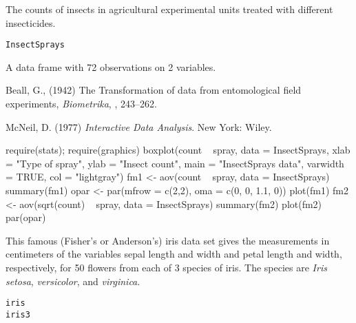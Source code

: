 %
\begin{Description}\relax
The counts of insects in agricultural experimental units treated with
different insecticides.
\end{Description}
%
\begin{Usage}
\begin{verbatim}
InsectSprays
\end{verbatim}
\end{Usage}
%
\begin{Format}
A data frame with 72 observations on 2 variables.

\end{Format}
%
\begin{Source}\relax
Beall, G., (1942)
The Transformation of data from entomological field experiments,
\emph{Biometrika}, , 243--262.
\end{Source}
%
\begin{References}\relax
McNeil, D. (1977) \emph{Interactive Data Analysis}.
New York: Wiley.
\end{References}
%
\begin{Examples}
\begin{ExampleCode}
require(stats); require(graphics)
boxplot(count ~ spray, data = InsectSprays,
        xlab = "Type of spray", ylab = "Insect count",
        main = "InsectSprays data", varwidth = TRUE, col = "lightgray")
fm1 <- aov(count ~ spray, data = InsectSprays)
summary(fm1)
opar <- par(mfrow = c(2,2), oma = c(0, 0, 1.1, 0))
plot(fm1)
fm2 <- aov(sqrt(count) ~ spray, data = InsectSprays)
summary(fm2)
plot(fm2)
par(opar)
\end{ExampleCode}
\end{Examples}
%
\begin{Description}\relax
This famous (Fisher's or Anderson's) iris data set gives the
measurements in centimeters of the variables sepal length and width
and petal length and width, respectively, for 50 flowers from each
of 3 species of iris.  The species are \emph{Iris setosa},
\emph{versicolor}, and \emph{virginica}.
\end{Description}
%
\begin{Usage}
\begin{verbatim}
iris
iris3
\end{verbatim}
\end{Usage}

